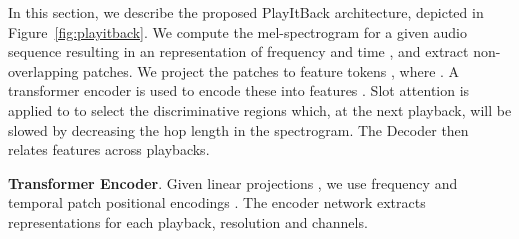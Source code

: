 \documentclass{article}
\begin{document}
In this section, we describe the proposed PlayItBack architecture, depicted in Figure~\ref{fig:playitback}. We compute the mel-spectrogram for a given audio sequence resulting in an  representation of frequency  and time , and extract  non-overlapping patches. We project the patches to feature tokens , where . A transformer encoder  is used to encode these into features . Slot attention  is applied to  to select the discriminative regions which, at the next playback, will be slowed by decreasing the hop length in the spectrogram. The Decoder  then relates features across playbacks.



\noindent
\textbf{Transformer Encoder}. Given linear projections , we use frequency and temporal patch positional encodings . The encoder network  extracts representations for each playback,  resolution and  channels. 
\end{document}
